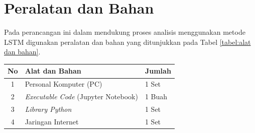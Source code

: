 %

\section{Peralatan dan Bahan}

Pada perancangan ini dalam mendukung proses analisis menggunakan metode LSTM digunakan peralatan dan bahan yang ditunjukkan pada Tabel \ref{tabel:alat dan bahan}. 

\begin{minipage}{\linewidth}
	\centering
	\vspace{-8 pt}
	\begin{tabular}{|c|l|l|} 
		\hline
		\textbf{No} & \textbf{Alat dan Bahan}  & \textbf{Jumlah}  \\ 
		\hline
		1           & Personal Komputer (PC)   & 1 Set            \\ 
		\hline
		2           & \textit{Executable Code} (Jupyter Notebook) & 1 Buah           \\ 
		\hline
		3           & \textit{Library Python}  & 1 Set            \\
		\hline
		4           & Jaringan Internet  & 1 Set            \\
		\hline
	\end{tabular}
	\label{tabel:alat dan bahan}
\end{minipage}







